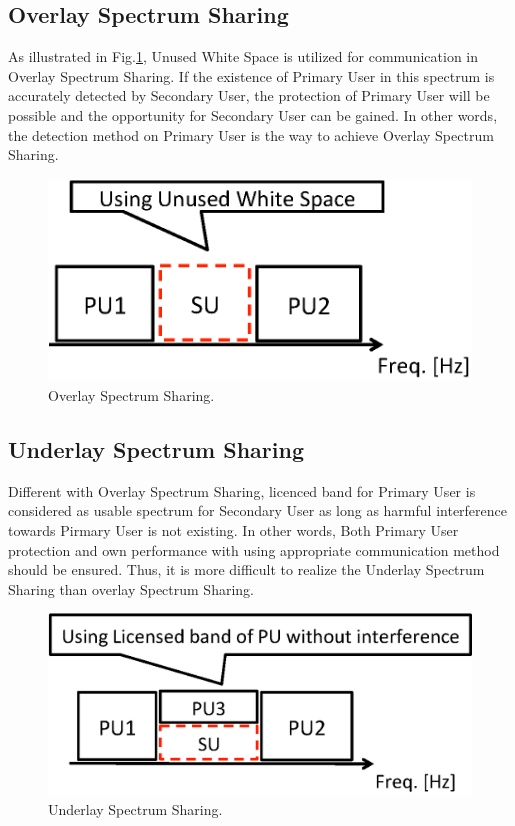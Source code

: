 \subsection{Overlay Spectrum Sharing}
As illustrated in Fig.\ref{fig:overlay}, Unused White Space is utilized for communication in Overlay Spectrum Sharing. If the existence of Primary User in this spectrum is accurately detected by Secondary User, the protection of Primary User will be possible and the opportunity for Secondary User can be gained. In other words, the detection method on Primary User is  the way to achieve Overlay Spectrum Sharing.
    
\begin{figure}[!htp]
\begin{center}
\includegraphics[width=120mm,clip]{overlay.eps}
\caption{Overlay Spectrum Sharing.}
\label{fig:overlay}
\end{center}
\end{figure}

\subsection{Underlay Spectrum Sharing}
 Different with Overlay Spectrum Sharing, licenced band for Primary User is considered as usable spectrum for Secondary User as long as harmful interference towards Pirmary User is not existing. In other words, Both Primary User protection and own performance with using appropriate communication method should be ensured. Thus, it is more difficult to realize the Underlay Spectrum Sharing than overlay Spectrum Sharing.
\begin{figure}[!htp]
\begin{center}
\includegraphics[width=120mm,clip]{underlay.eps}
\caption{Underlay Spectrum Sharing.}
\label{fig:underlay}
\end{center}
\end{figure}


